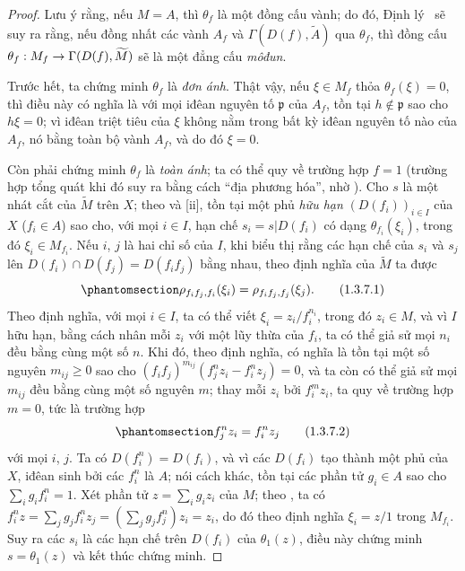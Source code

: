 \documentclass[oneside]{amsart}
\makeatletter
\renewcommand{\geq}{\geqslant}
\newcommand{\ega@arrow}[2]{\mathchoice{#1}{#2}{#2}{#2}}
\renewcommand{\to}{\ega@arrow{\longrightarrow}{\rightarrow}}
\newcommand{\oldpage}[2][]{{\marginnote{\normalfont\textbf{#1}~|~#2}}\ignorespaces}
\let\EGAOriginalLabel\label
\renewcommand{\label}[1]{\phantomsection\EGAOriginalLabel{#1}}
\makeatother
\begin{document}
\begin{proof}
Lưu ý rằng, nếu $M=A$, thì $\theta_f$ là một đồng cấu vành;
do đó, Định lý~ sẽ suy ra rằng, nếu đồng nhất các vành $A_f$ và $\Gamma(D(f),\widetilde{A})$ qua $\theta_f$, thì đồng cấu $\theta_f:M_f\to\Gamma(D(f),\widetilde{M})$ sẽ là một đẳng cấu \emph{môđun}.

Trước hết, ta chứng minh $\theta_f$ là \emph{đơn ánh}.
Thật vậy, nếu $\xi\in M_f$ thỏa $\theta_f(\xi)=0$, thì điều này có nghĩa là với mọi iđêan nguyên tố $\mathfrak{p}$ của $A_f$, tồn tại $h\not\in\mathfrak{p}$ sao cho $h\xi=0$;
vì iđêan triệt tiêu của $\xi$ không nằm trong bất kỳ iđêan nguyên tố nào của $A_f$, nó bằng toàn bộ vành $A_f$, và do đó $\xi=0$.

Còn phải chứng minh $\theta_f$ là \emph{toàn ánh};
ta có thể quy về trường hợp $f=1$ (trường hợp tổng quát khi đó suy ra bằng cách ``địa phương hóa'', nhờ ).
Cho $s$ là một nhát cắt của $\widetilde{M}$ trên $X$;
theo  và [ii], tồn tại một phủ \emph{hữu hạn} $(D(f_i))_{i\in I}$ của $X$ ($f_i\in A$) sao cho, với mọi $i\in I$, hạn chế $s_i=s|D(f_i)$ có dạng $\theta_{f_i}(\xi_i)$, trong đó $\xi_i\in M_{f_i}$.
Nếu $i$, $j$ là hai chỉ số của $I$, khi biểu thị rằng các hạn chế của $s_i$ và $s_j$ lên $D(f_i)\cap D(f_j)=D(f_i f_j)$ bằng nhau, theo định nghĩa của $\widetilde{M}$ ta được
\[
  \label{I.1.3.7.1}
  \rho_{f_i f_j,f_i}(\xi_i)=\rho_{f_i f_j,f_j}(\xi_j).
  \tag{1.3.7.1}
\]
Theo định nghĩa, với mọi $i\in I$, ta có thể viết $\xi_i=z_i/f_i^{n_i}$, trong đó $z_i\in M$, và vì $I$ hữu hạn, bằng cách nhân mỗi $z_i$ với một lũy thừa của $f_i$, ta có thể giả sử mọi $n_i$ đều bằng cùng một số $n$.
Khi đó, theo định nghĩa,  có nghĩa là tồn tại một số nguyên $m_{ij}\geq 0$ sao cho $(f_i f_j)^{m_{ij}}(f_j^n z_i-f_i^n z_j)=0$, và ta còn có thể giả sử mọi $m_{ij}$ đều bằng cùng một số nguyên $m$;
thay mỗi $z_i$ bởi $f_i^m z_i$, ta quy về trường hợp $m=0$, tức là trường hợp
\[
  \label{I.1.3.7.2}
  f_j^n z_i=f_i^n z_j
  \tag{1.3.7.2}
\]
với mọi $i$, $j$.
Ta có $D(f_i^n)=D(f_i)$, và vì các $D(f_i)$ tạo thành một phủ của $X$, iđêan sinh bởi các $f_i^n$ là $A$;
nói cách khác, tồn tại các phần tử $g_i\in A$ sao cho $\sum_i g_i f_i^n=1$.
Xét phần tử $z=\sum_i g_i z_i$ của $M$;
theo , ta có $f_i^n z=\sum_j g_j f_i^n z_j=(\sum_j g_j f_j^n)z_i=z_i$, do đó theo định nghĩa $\xi_i=z/1$ trong $M_{f_i}$.
Suy ra
\oldpage[I]{87}
các $s_i$ là các hạn chế trên $D(f_i)$ của $\theta_1(z)$, điều này chứng minh $s=\theta_1(z)$ và kết thúc chứng minh.
\end{proof}
\end{document}
